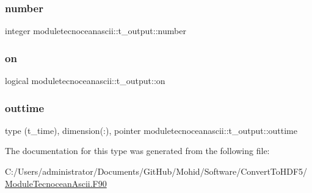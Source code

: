 \subsubsection{\texorpdfstring{number}{number}}
{\footnotesize\ttfamily integer moduletecnoceanascii\+::t\+\_\+output\+::number\hspace{0.3cm}{\ttfamily [private]}}

\mbox{\label{structmoduletecnoceanascii_1_1t__output_abd1750e484260cb9c4e8e5dce7e763aa}} 
\subsubsection{\texorpdfstring{on}{on}}
{\footnotesize\ttfamily logical moduletecnoceanascii\+::t\+\_\+output\+::on\hspace{0.3cm}{\ttfamily [private]}}

\mbox{\label{structmoduletecnoceanascii_1_1t__output_a7f2b5ac343e033a4ecd53b766c15562e}} 
\subsubsection{\texorpdfstring{outtime}{outtime}}
{\footnotesize\ttfamily type (t\+\_\+time), dimension(\+:), pointer moduletecnoceanascii\+::t\+\_\+output\+::outtime\hspace{0.3cm}{\ttfamily [private]}}



The documentation for this type was generated from the following file\+:\begin{DoxyCompactItemize}
\item 
C\+:/\+Users/administrator/\+Documents/\+Git\+Hub/\+Mohid/\+Software/\+Convert\+To\+H\+D\+F5/\mbox{\hyperlink{_module_tecnocean_ascii_8_f90}{Module\+Tecnocean\+Ascii.\+F90}}\end{DoxyCompactItemize}
